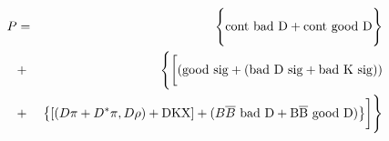 \documentclass[12pt]{article}
\def\gs{{\rm good\ sig}}
\def\badD{{\rm bad\ D\ sig}}
\def\badK{{\rm bad\ K\ sig}}
\def\Dpi{{D\pi}}
\def\Dstpi{{D^*\pi, D\rho}}
\def\DKX{{\rm DKX}}
\def\contBadD{{\rm cont\ bad\ D}}
\def\contGoodD{{\rm cont\ good\ D}}
\def\BB{{B\overline B}}
\def\BBBadD{\BB\ \rm bad\ D}
\def\BBGoodD{\BB\ \rm good\ D}
\begin{document}
\begin{eqnarray}
P &=& \Biggl\{\contBadD + \contGoodD\Biggr\}\nonumber\\
&+& \Biggl\{\biggl[ (\gs + (\badD + \badK)) \nonumber\\
&+& \bigl\{ [(\Dpi + \Dstpi) + \DKX] + (\BBBadD + \BBGoodD)\bigr\}
\biggr] \Biggr\} \nonumber
\end{eqnarray}
\end{document}
